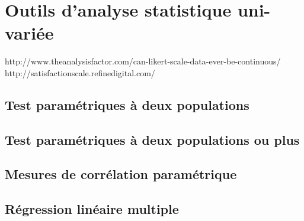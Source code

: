 \chapter{Outils d'analyse statistique uni-variée}
\label{app:statuni}

http://www.theanalysisfactor.com/can-likert-scale-data-ever-be-continuous/ \\
http://satisfactionscale.refinedigital.com/
\section{Test paramétriques à deux populations}
\label{app:student}

\section{Test paramétriques à deux populations ou plus}
\label{app:anova}

\section{Mesures de corrélation paramétrique}
\label{app:corr}

\section{Régression linéaire multiple}
\label{app:regressionMultiple}

